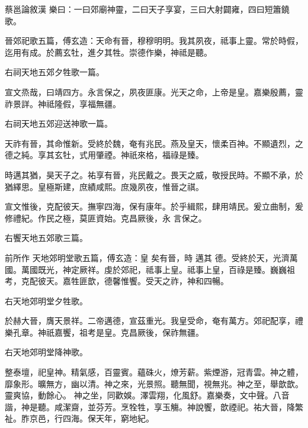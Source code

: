 
\begin{pinyinscope}

 蔡邕論敘漢
 樂曰：一曰郊廟神靈，二曰天子享宴，三曰大射闢雍，四曰短簫鐃歌。



 晉郊祀歌五篇，傅玄造：天命有晉，穆穆明明。我其夙夜，祗事上靈。常於時假，迄用有成。於薦玄牡，進夕其牲。崇德作樂，神祗是聽。



 右祠天地五郊夕牲歌一篇。



 宣文烝哉，曰靖四方。永言保之，夙夜匪康。光天之命，上帝是皇。嘉樂殷薦，靈祚景詳。神祗隆假，享福無疆。



 右祠天地五郊迎送神歌一篇。



 天祚有晉，其命惟新。受終於魏，奄有兆民。燕及皇天，懷柔百神。不顯遺烈，之德之純。享其玄牡，式用肇禋。神祇來格，福祿是臻。



 時邁其猶，昊天子之。祐享有晉，兆民戴之。畏天之威，敬授民時。不顯不承，於猶繹思。皇極斯建，庶績咸熙。庶幾夙夜，惟晉之祺。



 宣文惟後，克配彼天。撫寧四海，保有康年。於乎緝熙，肆用靖民。爰立曲制，爰修禮紀。作民之極，莫匪資始。克昌厥後，永
 言保之。



 右饗天地五郊歌三篇。



 前所作
 天地郊明堂歌五篇，傅玄造：皇
 矣有晉，時
 邁其
 德。受終於天，光濟萬國。萬國既光，神定厥祥。虔於郊祀，祗事上皇。祗事上皇，百祿是臻。巍巍祖考，克配彼天。嘉牲匪歆，德馨惟饗。受天之祚，神和四暢。



 右天地郊明堂夕牲歌。



 於赫大晉，膺天景祥。二帝邁德，宣茲重光。我皇受命，奄有萬方。郊祀配享，禮樂孔章。神祇嘉饗，祖考是皇。克昌厥後，保祚無疆。



 右天地郊明堂降神歌。



 整泰壇，祀皇神。精氣感，百靈賓。蘊硃火，燎芳薪。紫煙游，冠青雲。神之體，靡象形。曠無方，幽以清。神之來，光景照。聽無聞，視無兆。神之至，舉歆歆。靈爽協，動餘心。
 神之坐，同歡娛。澤雲翔，化風舒。嘉樂奏，文中聲。八音諧，神是聽。咸潔齋，並芬芳。烹牷牲，享玉觴。神說饗，歆禋祀。祐大晉，降繁祉。胙京邑，行四海。保天年，窮地紀。




\end{pinyinscope}
